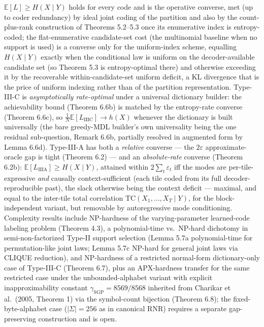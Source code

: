 \documentclass[
]{article}
\begin{document}
$\mathbb{E}[L] \geq H(X \mid Y)$ holds for every code and is the operative
converse, met (up to coder redundancy) by ideal joint coding of the
partition and also by the count-plus-rank construction of
Theorems 5.2--5.3 once its enumerative index is entropy-coded; the
flat-enumerative candidate-set cost (the multinomial baseline when no
support is used) is a converse only for the uniform-index scheme,
equalling $H(X \mid Y)$ exactly when the conditional law is uniform on the
decoder-available candidate set (so Theorem 5.3 is entropy-optimal there)
and otherwise exceeding it by the recoverable within-candidate-set
uniform deficit, a KL divergence that is the price of uniform indexing
rather than of the partition representation. Type-III-C is
\emph{asymptotically rate-optimal} under a universal dictionary builder:
the achievability bound (Theorem 6.6b) is matched by the entropy-rate
converse (Theorem 6.6c), so $\tfrac{1}{N}\mathbb{E}[L_{\mathrm{IIIC}}]
\to h(X)$ whenever the dictionary is built universally (the bare
greedy-MDL builder's own universality being the one residual sub-question,
Remark 6.6b, partially resolved in augmented form by Lemma 6.6d). Type-III-A has both a \emph{relative} converse --- the
$2\varepsilon$ approximate-oracle gap is tight (Theorem 6.2) --- and an
\emph{absolute-rate} converse (Theorem 6.2b): $\mathbb{E}[L_{\mathrm{IIIA}}]
\ge H(X\mid Y)$, attained within $2\sum_t\varepsilon_t$ iff the modes are
per-tile-expressive \emph{and} causally context-sufficient (each tile
coded from its full decoder-reproducible past), the slack otherwise being
the context deficit --- maximal, and equal to the inter-tile total
correlation $\mathrm{TC}(X_1,\ldots,X_T\mid Y)$, for the block-independent
variant, but removable by autoregressive mode conditioning. Complexity
results include
NP-hardness of the
varying-parameter learned-code labeling problem (Theorem 4.3), a
polynomial-time vs.\ NP-hard dichotomy in semi-non-factorized
Type-II support selection (Lemma 5.7a polynomial-time for
permutation-like joint laws; Lemma 5.7c NP-hard for general joint
laws via CLIQUE reduction), and NP-hardness of a restricted
normal-form dictionary-only case of Type-III-C (Theorem 6.7), plus
an APX-hardness transfer for the same restricted case under the
unbounded-alphabet variant with explicit inapproximability constant
$\gamma_{\mathrm{SGP}} = 8569/8568$ inherited from Charikar et al.\
(2005, Theorem 1) via the symbol-count bijection (Theorem 6.8); the
fixed-byte-alphabet case ($|\Sigma| = 256$ as in canonical RNR)
requires a separate gap-preserving construction and is open.
\end{document}
